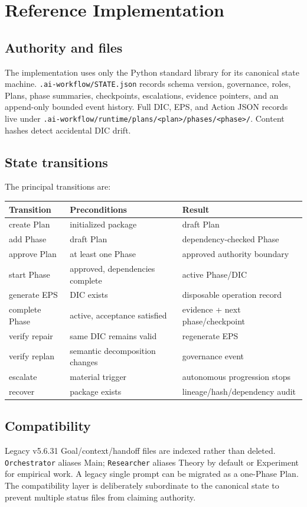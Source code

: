 \documentclass[11pt]{article}
\begin{document}
\section{Reference Implementation}
\subsection{Authority and files}
The implementation uses only the Python standard library for its canonical state machine. \texttt{.ai-workflow/STATE.json} records schema version, governance, roles, Plans, phase summaries, checkpoints, escalations, evidence pointers, and an append-only bounded event history. Full DIC, EPS, and Action JSON records live under
\texttt{.ai-workflow/runtime/plans/<plan>/phases/<phase>/}. Content hashes detect accidental DIC drift.

\subsection{State transitions}
The principal transitions are:
\begin{center}
\small
\begin{tabular}{lll}
\toprule
Transition & Preconditions & Result\\
\midrule
create Plan & initialized package & draft Plan\\
add Phase & draft Plan & dependency-checked Phase\\
approve Plan & at least one Phase & approved authority boundary\\
start Phase & approved, dependencies complete & active Phase/DIC\\
generate EPS & DIC exists & disposable operation record\\
complete Phase & active, acceptance satisfied & evidence + next phase/checkpoint\\
verify repair & same DIC remains valid & regenerate EPS\\
verify replan & semantic decomposition changes & governance event\\
escalate & material trigger & autonomous progression stops\\
recover & package exists & lineage/hash/dependency audit\\
\bottomrule
\end{tabular}
\end{center}

\subsection{Compatibility}
Legacy v5.6.31 Goal/context/handoff files are indexed rather than deleted. \texttt{Orchestrator} aliases Main; \texttt{Researcher} aliases Theory by default or Experiment for empirical work. A legacy single prompt can be migrated as a one-Phase Plan. The compatibility layer is deliberately subordinate to the canonical state to prevent multiple status files from claiming authority.
\end{document}
